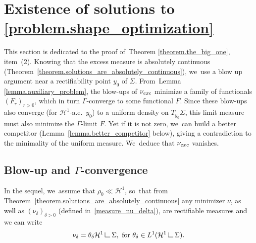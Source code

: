 \documentclass[11pt]{article}
\numberwithin{equation}{section}
\theoremstyle{definition}
\newcommand\LM[1]{\hbox{\vrule width.5pt \vbox to#1pt{\vfill \hrule width#1pt height.5pt}}}
\newcommand\LL{{\mathchoice {\>\LM7\>}{\>\LM7\>}{\,\LM5\,}{\,\LM{3.35}\,}}}
\newcommand{\mres}{\LL}
\newcommand\cH{\mathcal{H}}
\newcommand{\nuexc}{\nu_{\textup{exc}}}
\begin{document}
\section{Existence of solutions to \texorpdfstring{\eqref{problem.shape_optimization}}{eqref}}\label{section.blowup}
This section is dedicated to the proof of~Theorem \ref{theorem.the_big_one}, item~(2). Knowing
that the excess measure is absolutely continuous (Theorem~\ref{theorem.solutions_are_absolutely_continuous}), we~use
a blow up argument near a rectifiability point $y_0$ of $\Sigma$.
From~Lemma \ref{lemma.auxiliary_problem}, the blow-ups of $\nuexc$ minimize a family of functionals $(F_r)_{r > 0}$, which in turn $\Gamma$-converge to some functional $F$.
Since these blow-ups also converge (for $\cH^1$-a.e.~$y_0$) to a uniform density on $T_{y_0}\Sigma$, this limit measure must also minimize the $\Gamma$-limit $F$.
Yet if it is not zero, we~can build a better competitor (Lemma~\ref{lemma.better_competitor} below), giving a contradiction to the minimality of the uniform measure. We~deduce that $\nuexc$ vanishes.

\subsection{Blow-up and $\Gamma$-convergence}\label{sec.gamma_convergence}
In the sequel, we~assume that $\rho_0 \ll \mathcal{H}^1$, so~that from Theorem~\ref{theorem.solutions_are_absolutely_continuous} any minimizer $\nu$, as well as ${(\nu_\delta)}_{\delta > 0}$ (defined in~\eqref{measure_nu_delta}), are rectifiable measures and we can write
\[
\nu_\delta = \theta_\delta \mathcal{H}^1\mres \Sigma,
\text{ for }
\theta_\delta \in L^1(\cH^1\mres \Sigma).
\]
\end{document}
